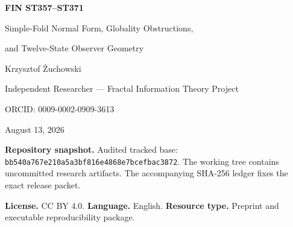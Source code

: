 \documentclass[11pt,a4paper]{article}
\begin{document}
\hypersetup{pageanchor=false}
\begin{titlepage}\centering
\vspace*{1cm}{\Large Fractal Information Theory Project\par}\vspace{.8cm}
{\huge\bfseries FIN ST357--ST371\par}\vspace{.35cm}
{\LARGE Simple-Fold Normal Form, Globality Obstructions,\par}
{\LARGE and Twelve-State Observer Geometry\par}
\vspace{.85cm}{\large Local analytical, interval, exact finite, and bounded numerical research\par}
\vfill{\Large Krzysztof \hspace{.04em}\.{Z}uchowski\par}\vspace{.2cm}
{\large Independent Researcher --- Fractal Information Theory Project\par}
{\large ORCID: 0009-0002-0909-3613\par}\vspace{.7cm}
{\large August 13, 2026\par}\vspace{.2cm}{\large Release 10.81\par}\vfill
\begin{minipage}{.92\textwidth}\small
\textbf{Repository snapshot.} Audited tracked base:
\texttt{bb540a767e210a5a3bf816e4868e7bcefbac3872}. The working tree contains
uncommitted research artifacts. The accompanying SHA-256 ledger fixes the exact release packet.

\medskip\textbf{License.} CC BY 4.0. \quad \textbf{Language.} English. \quad
\textbf{Resource type.} Preprint and executable reproducibility package.
\end{minipage}\end{titlepage}
\hypersetup{pageanchor=true}
\end{document}
